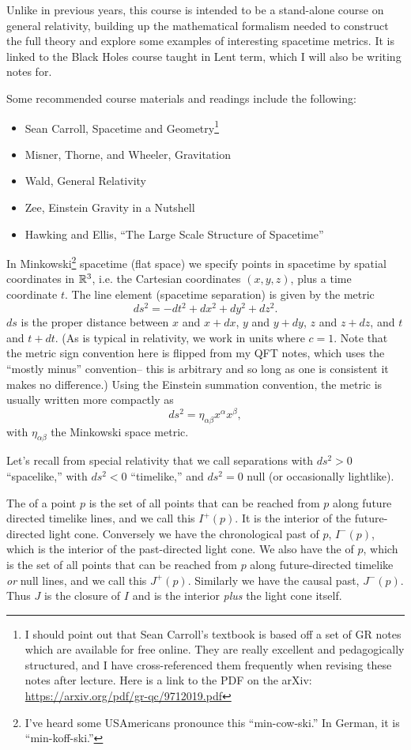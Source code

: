 Unlike in previous years, this course is intended to be a stand-alone course on general relativity, building up the mathematical formalism needed to construct the full theory and explore some examples of interesting spacetime metrics. It is linked to the Black Holes course taught in Lent term, which I will also be writing notes for.

Some recommended course materials and readings include the following:
\begin{itemize}
\item Sean Carroll, Spacetime and Geometry\footnote{I should point out that Sean Carroll's textbook is based off a set of GR notes which are available for free online. They are really excellent and pedagogically structured, and I have cross-referenced them frequently when revising these notes after lecture. Here is a link to the PDF on the arXiv: \url{https://arxiv.org/pdf/gr-qc/9712019.pdf}}
\item Misner, Thorne, and Wheeler, Gravitation
\item Wald, General Relativity
\item Zee, Einstein Gravity in a Nutshell
\item Hawking and Ellis, ``The Large Scale Structure of Spacetime''
\end{itemize}

In Minkowski\footnote{I've heard some USAmericans pronounce this ``min-cow-ski.'' In German, it is ``min-koff-ski.''} spacetime (flat space) we specify points in spacetime by spatial coordinates in $\mathbb{R}^3$, i.e. the Cartesian coordinates $(x,y,z)$, plus a time coordinate $t$. The line element (spacetime separation) is given by the metric
$$ds^2=-dt^2+dx^2+dy^2+dz^2.$$
$ds$ is the proper distance between $x$ and $x+dx$, $y$ and $y+dy$, $z$ and $z+dz$, and $t$ and $t+dt$. (As is typical in relativity, we work in units where $c=1$. Note that the metric sign convention here is flipped from my QFT notes, which uses the ``mostly minus'' convention-- this is arbitrary and so long as one is consistent it makes no difference.) Using the Einstein summation convention, the metric is usually written more compactly as $$ds^2=\eta_{\alpha\beta}x^\alpha x^\beta,$$ with $\eta_{\alpha\beta}$ the Minkowski space metric.

Let's recall from special relativity that we call separations with $ds^2>0$ ``spacelike,'' with $ds^2<0$ ``timelike,'' and $ds^2=0$ null (or occasionally lightlike).
\begin{defn}
The  of a point $p$ is the set of all points that can be reached from $p$ along future directed timelike lines, and we call this $I^+(p)$. It is the interior of the future-directed light cone. Conversely we have the chronological past of $p$, $I^-(p)$, which is the interior of the past-directed light cone. We also have the  of $p$, which is the set of all points that can be reached from $p$ along future-directed timelike \emph{or} null lines, and we call this $J^+(p)$. Similarly we have the causal past, $J^-(p)$. Thus $J$ is the closure of $I$ and is the interior \emph{plus} the light cone itself.
\end{defn}

